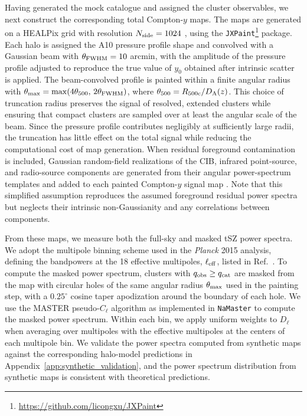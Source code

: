 \documentclass[aps,prd,twocolumn,superscriptaddress,nofootinbib,floatfix]{revtex4-2}
\begin{document}
Having generated the mock catalogue and assigned the cluster observables, we next construct the corresponding total Compton-$y$ maps. The maps are generated on a HEALPix grid with resolution $N_{\rm side}=1024$ \citep{Gorski2005}, using the \texttt{JXPaint}\footnote{\url{https://github.com/licongxu/JXPaint}} package. Each halo is assigned the A10 pressure profile shape and convolved with a Gaussian beam with $\theta_{\rm FWHM}= 10$ arcmin, with the amplitude of the pressure profile adjusted to reproduce the true value of $y_0$ obtained after intrinsic scatter is applied. The beam-convolved profile is painted within a finite angular radius with $\theta_{\rm max}=\max\!\left(4\theta_{500},\,2\theta_{\rm FWHM}\right)$, where $\theta_{500}=R_{500\mathrm{c}}/D_{\rm A}(z)$. This choice of truncation radius preserves the signal of resolved, extended clusters while ensuring that compact clusters are sampled over at least the angular scale of the beam. Since the pressure profile contributes negligibly at sufficiently large radii, the truncation has little effect on the total signal while reducing the computational cost of map generation. When residual foreground contamination is included, Gaussian random-field realizations of the CIB, infrared point-source, and radio-source components are generated from their angular power-spectrum templates and added to each painted Compton-$y$ signal map \citep{Planck2015XXII}. Note that this simplified assumption reproduces the assumed foreground residual power spectra but neglects their intrinsic non-Gaussianity and any correlations between components.

From these maps, we measure both the full-sky and masked tSZ power spectra. We adopt the multipole binning scheme used in the \textit{Planck} 2015 analysis, defining the bandpowers at the 18 effective multipoles, $\ell_{\rm eff}$, listed in Ref.~\citep{Planck2015XXII}. To compute the masked power spectrum, clusters with $q_{\rm obs}\ge q_{\rm cat}$ are masked from the map with circular holes of the same angular radius $\theta_{\rm max}$ used in the painting step, with a $0.25^\circ$ cosine taper apodization around the boundary of each hole. We use the MASTER pseudo-$C_\ell$ algorithm \citep{Hivon2002} as implemented in \texttt{NaMaster} \citep{Alonso2019} to compute the masked power spectrum. Within each bin, we apply uniform weights to $D_\ell$ when averaging over multipoles with the effective multipoles at the centers of each multipole bin. We validate the power spectra computed from synthetic maps against the corresponding halo-model predictions in Appendix~\ref{app:synthetic_validation}, and the power spectrum distribution from synthetic maps is consistent with theoretical predictions.
\end{document}
